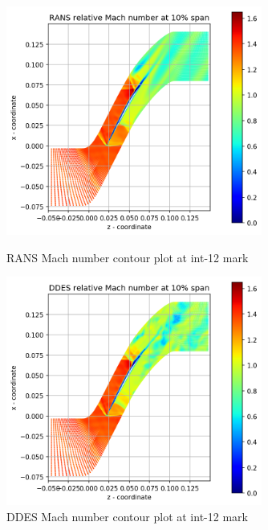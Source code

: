 \begin{figure}[ht]
  \centering
%  

  \includegraphics[width=0.75\textwidth]{Pictures/rans-mach-int-12.png}
  \caption{RANS Mach number contour plot at int-12 mark} \label{int-12-rans-mach}
  
   \vspace*{\floatsep}%
   
  \includegraphics[width=0.75\textwidth]{Pictures/ddes-mach-int-12.png}
  \caption{DDES Mach number contour plot at int-12 mark} \label{int-12-ddes-mach}
\end{figure}